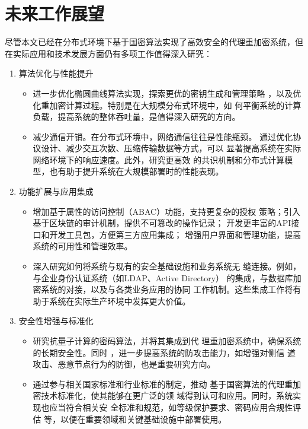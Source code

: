 \section{未来工作展望}

尽管本文已经在分布式环境下基于国密算法实现了高效安全的代理重加密系统，但
在实际应用和技术发展方面仍有多项工作值得深入研究：

\begin{enumerate}
	\item 算法优化与性能提升
	      \begin{itemize}
		      \item 进一步优化椭圆曲线算法实现，探索更优的密钥生成和管理策略
		            ，以及优化重加密计算过程。特别是在大规模分布式环境中，如
		            何平衡系统的计算负载，提高系统的整体吞吐量，是值得深入研究的方向。

		      \item 减少通信开销。在分布式环境中，网络通信往往是性能瓶颈。
		            通过优化协议设计、减少交互次数、压缩传输数据等方式，可以
		            显著提高系统在实际网络环境下的响应速度。此外，研究更高效
		            的共识机制和分布式计算模型，也有助于提升系统在大规模部署时的性能表现。
	      \end{itemize}

	\item 功能扩展与应用集成
	      \begin{itemize}
		      \item 增加基于属性的访问控制（ABAC）功能，支持更复杂的授权
		            策略；引入基于区块链的审计机制，提供不可篡改的操作记录；
		            开发更丰富的API接口和开发工具包，方便第三方应用集成；
		            增强用户界面和管理功能，提高系统的可用性和管理效率。

		      \item 深入研究如何将系统与现有的安全基础设施和业务系统无
		            缝连接。例如，与企业身份认证系统（如LDAP、Active Directory）
		            的集成，与数据库加密系统的对接，以及与各类业务应用的协同
		            工作机制。这些集成工作将有助于系统在实际生产环境中发挥更大价值。
	      \end{itemize}

	\item 安全性增强与标准化
	      \begin{itemize}
		      \item 研究抗量子计算的密码算法，并将其集成到代
		            理重加密系统中，确保系统的长期安全性。同时
		            ，进一步提高系统的防攻击能力，如增强对侧信
		            道攻击、恶意节点行为的防御，也是重要研究方向。

		      \item 通过参与相关国家标准和行业标准的制定，推动
		            基于国密算法的代理重加密技术标准化，使其能够在更广泛的领
		            域得到认可和应用。同时，系统实现也应当符合相关安
		            全标准和规范，如等级保护要求、密码应用合规性评估
		            等，以便在重要领域和关键基础设施中部署使用。
	      \end{itemize}
\end{enumerate}

